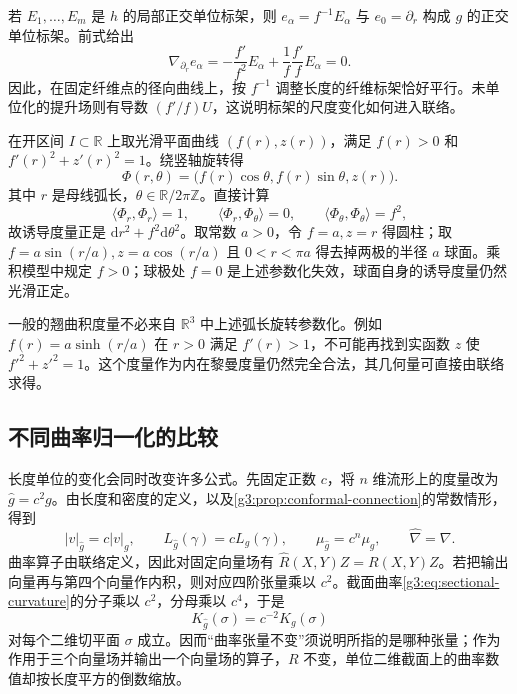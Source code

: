 若 \(E_1,\ldots,E_m\) 是 \(h\) 的局部正交单位标架，则 \(e_\alpha=f^{-1}E_\alpha\) 与 \(e_0=\partial_r\) 构成 \(g\) 的正交单位标架。前式给出
\[
	\nabla_{\partial_r}e_\alpha
	=-\frac{f'}{f^2}E_\alpha+\frac1f\frac{f'}f E_\alpha=0.
\]
因此，在固定纤维点的径向曲线上，按 \(f^{-1}\) 调整长度的纤维标架恰好平行。未单位化的提升场则有导数 \((f'/f)U\)，这说明标架的尺度变化如何进入联络。

\begin{example}\label{g3:exm:surface-of-revolution-metric}
	在开区间 \(I\subset\mathbb R\) 上取光滑平面曲线 \((f(r),z(r))\)，满足 \(f(r)>0\) 和 \(f'(r)^2+z'(r)^2=1\)。绕竖轴旋转得
	\[
		\Phi(r,\theta)=\bigl(f(r)\cos\theta,f(r)\sin\theta,z(r)\bigr).
	\]
	其中 \(r\) 是母线弧长，\(\theta\in\mathbb R/2\pi\mathbb Z\)。直接计算
	\[
		\langle\Phi_r,\Phi_r\rangle=1,\qquad
		\langle\Phi_r,\Phi_\theta\rangle=0,\qquad
		\langle\Phi_\theta,\Phi_\theta\rangle=f^2,
	\]
	故诱导度量正是 \(\mathrm dr^2+f^2\mathrm d\theta^2\)。取常数 \(a>0\)，令 \(f=a,z=r\) 得圆柱；取 \(f=a\sin(r/a),z=a\cos(r/a)\) 且 \(0<r<\pi a\) 得去掉两极的半径 \(a\) 球面。乘积模型中规定 \(f>0\)；球极处 \(f=0\) 是上述参数化失效，球面自身的诱导度量仍然光滑正定。
\end{example}

一般的翘曲积度量不必来自 \(\mathbb R^3\) 中上述弧长旋转参数化。例如 \(f(r)=a\sinh(r/a)\) 在 \(r>0\) 满足 \(f'(r)>1\)，不可能再找到实函数 \(z\) 使 \(f'^2+z'^2=1\)。这个度量作为内在黎曼度量仍然完全合法，其几何量可直接由联络求得。

\subsection{不同曲率归一化的比较}
\label{g3:subsec:0104:04}
长度单位的变化会同时改变许多公式。先固定正数 \(c\)，将 \(n\) 维流形上的度量改为 \(\widehat g=c^2g\)。由长度和密度的定义，以及\cref{g3:prop:conformal-connection}的常数情形，得到
\begin{equation}\label{g3:eq:constant-metric-scaling}
	|v|_{\widehat g}=c|v|_g,\qquad
	L_{\widehat g}(\gamma)=cL_g(\gamma),\qquad
	\mu_{\widehat g}=c^n\mu_g,\qquad
	\widehat\nabla=\nabla.
\end{equation}
曲率算子由联络定义，因此对固定向量场有 \(\widehat R(X,Y)Z=R(X,Y)Z\)。若把输出向量再与第四个向量作内积，则对应四阶张量乘以 \(c^2\)。截面曲率\eqref{g3:eq:sectional-curvature}的分子乘以 \(c^2\)，分母乘以 \(c^4\)，于是
\begin{equation}\label{g3:eq:sectional-curvature-scaling}
	K_{\widehat g}(\sigma)=c^{-2}K_g(\sigma)
\end{equation}
对每个二维切平面 \(\sigma\) 成立。因而“曲率张量不变”须说明所指的是哪种张量；作为作用于三个向量场并输出一个向量场的算子，\(R\) 不变，单位二维截面上的曲率数值却按长度平方的倒数缩放。

